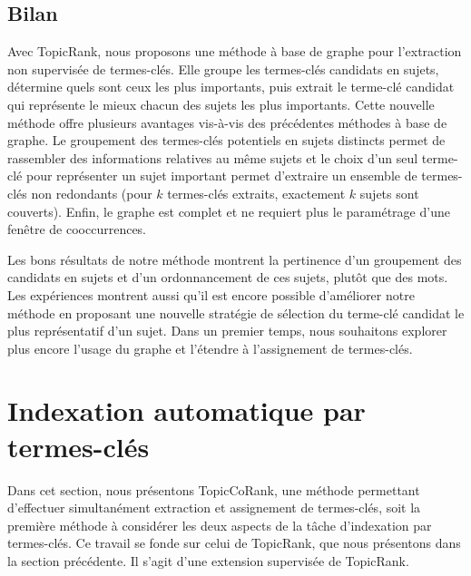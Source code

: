       \subsection{Bilan}
      \label{subsec:main-automatic_keyphrase_annotation-unsupervised_automatic_keyphrase_extraction-bilan}
        Avec TopicRank, nous proposons une méthode à base de graphe pour
        l'extraction non supervisée de termes-clés. Elle groupe les termes-clés
        candidats en sujets, détermine quels sont ceux les plus importants, puis
        extrait le terme-clé candidat qui représente le mieux chacun des sujets
        les plus importants. Cette nouvelle méthode offre plusieurs avantages
        vis-à-vis des précédentes méthodes à base de graphe. Le groupement des
        termes-clés potentiels en sujets distincts permet de rassembler des
        informations relatives au même sujets et le choix d'un seul terme-clé
        pour représenter un sujet important permet d'extraire un ensemble de
        termes-clés non redondants (pour $k$ termes-clés extraits, exactement
        $k$ sujets sont couverts). Enfin, le graphe est complet et ne requiert
        plus le paramétrage d'une fenêtre de cooccurrences.

        Les bons résultats de notre méthode montrent la pertinence d'un
        groupement des candidats en sujets et d'un ordonnancement de ces sujets,
        plutôt que des mots. Les expériences montrent aussi qu'il est encore
        possible d'améliorer notre méthode en proposant une nouvelle stratégie
        de sélection du terme-clé candidat le plus représentatif d'un sujet.
        Dans un premier temps, nous souhaitons explorer plus encore l'usage du
        graphe et l'étendre à l'assignement de termes-clés.


  \section{Indexation automatique par termes-clés}
  \label{sec:main-automatic_keyphrase_annotation-supervised_automatic_keyphrase_extraction}
    Dans cet section, nous présentons TopicCoRank, une méthode permettant
    d'effectuer simultanément extraction et assignement de termes-clés, soit la
    première méthode à considérer les deux aspects de la tâche d'indexation par
    termes-clés. Ce travail se fonde sur celui de TopicRank, que nous présentons
    dans la section précédente. Il s'agit d'une extension supervisée de
    TopicRank.

